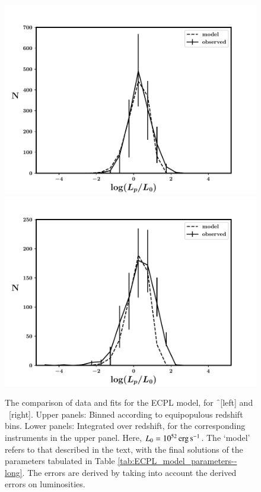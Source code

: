 \begin{figure}
\begin{center}
\end{center}
\begin{center}
\includegraphics[scale=0.38]{ECPL--Fermi--total}
\includegraphics[scale=0.38]{ECPL--Swift--total}
\caption[Comparison of data and fits for the ECPL model]{The comparison of data and fits for the ECPL model, for \f\ [left] and \s\ [right]. Upper panels: Binned according to equipopulous redshift bins. Lower panels: Integrated over redshift, for the corresponding instruments in the upper panel. Here, $L_{0} = 10^{52} \, \rm erg \, s^{-1}$. The `model' refers to that described in the text, with the final solutions of the parameters tabulated in Table \ref{tab:ECPL_model_parameters--long}. The errors are derived by taking into account the derived errors on luminosities.}
\label{fig:bestfit_ECPL_models--long}
\end{center}
\end{figure}

